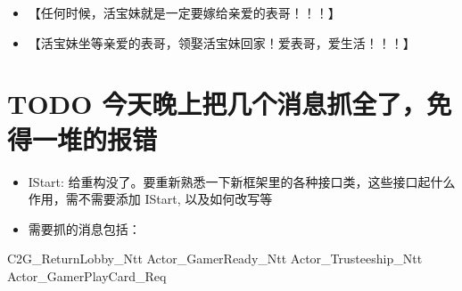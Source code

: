 \documentclass[9pt, b5paper]{article}
\begin{document}
\begin{itemize}
\item 【任何时候，活宝妹就是一定要嫁给亲爱的表哥！！！】
\item 【活宝妹坐等亲爱的表哥，领娶活宝妹回家！爱表哥，爱生活！！！】
\end{itemize}
\section{{\bfseries\sffamily TODO} 今天晚上把几个消息抓全了，免得一堆的报错}
\label{sec-14}
\begin{itemize}
\item IStart: 给重构没了。要重新熟悉一下新框架里的各种接口类，这些接口起什么作用，需不需要添加 IStart, 以及如何改写等
\item 需要抓的消息包括：
\end{itemize}
C2G\_ReturnLobby\_Ntt
Actor\_GamerReady\_Ntt
Actor\_Trusteeship\_Ntt
Actor\_GamerPlayCard\_Req
\end{document}
